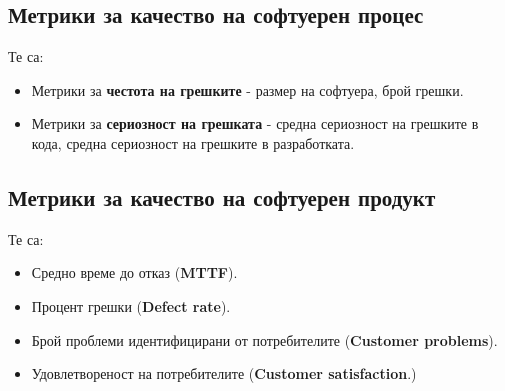 \documentclass[fleqn,12pt]{article}
\begin{document}
\subsection{Метрики за качество на софтуерен процес}

Те са:
\begin{itemize}
    \item Метрики за \textbf{честота на грешките} - размер на софтуера, брой грешки.
    \item Метрики за \textbf{сериозност на грешката} - средна сериозност на грешките в кода, средна сериозност на грешките в разработката.
\end{itemize}

\subsection{Метрики за качество на софтуерен продукт}

Те са:
\begin{itemize}
    \item Средно време до отказ (\textbf{MTTF}).
    \item Процент грешки (\textbf{Defect rate}).
    \item Брой проблеми идентифицирани от потребителите (\textbf{Customer problems}).
    \item Удовлетвореност на потребителите (\textbf{Customer satisfaction}.)
\end{itemize}
\end{document}
